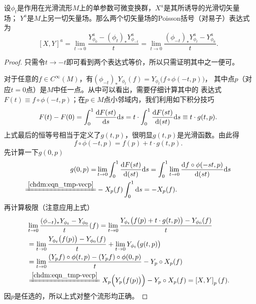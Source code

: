 \begin{theorem}\label{chdm:thm_xy-yx}
    设$\phi_t$是作用在光滑流形$M$上的单参数可微变换群，$X^a$是其所诱导的光滑切矢量场；
    $Y^a$是$M$上另一切矢量场。那么两个切矢量场的Poisson括号（对易子）表达式为
    \begin{equation}\label{chdm:eqn_xy-yx}
        \left[X,Y\right]^a = \lim_{t\to 0} \frac{Y^a_{\phi_{0}} - (\phi_{t})_{*} Y^a_{\phi_{-t}} }{t}
        =\lim_{t\to 0} \frac{(\phi_{-t})_{*} Y^a_{\phi_{t}} - Y^a_{\phi_{0}}}{t} .
    \end{equation}
\end{theorem}
\begin{proof}
    只需令$t\to -t$即可看到两个表达式等价，所以只需证明其中之一便可。
    
    对于任意的$f\in C^\infty(M)$，有$(\phi_{-t})_{*} Y_{\phi_{t}}(f)=Y_{\phi_{t}}\bigl( f\circ\phi({-t},p) \bigr)$，
    其中点$p$（对应$t=0$点）是$M$中任一点。从中可以看出，需要仔细计算其中的
    表达式$F(t)\equiv f\circ\phi({-t},p)$；在$p\in M$点小邻域内，我们利用如下积分技巧
    \begin{equation*}
        F(t)-F(0) = \int_{0}^{1} \frac{{\rm d} F(st)}{{\rm d} s} {\rm d}s
        = t \cdot \int_{0}^{1}  \frac{{\rm d} F(st)}{{\rm d} (st)} {\rm d}s 
        \equiv t \cdot g(t,p).
    \end{equation*}
    上式最后的恒等号相当于定义了$g(t,p)$，很明显$g(t,p)$是光滑函数。由此得
    \begin{equation}
        f\circ\phi({-t},p) = f(p) + t \cdot g(t,p) .
    \end{equation}
    先计算一下$g(0,p)$
    \begin{align*}
        g(0,p)=& \lim_{t\to 0} \int_{0}^{1}  \frac{{\rm d} F(st)}{{\rm d} (st)} {\rm d}s
        = \int_{0}^{1} \lim_{t\to 0} \frac{{\rm d} f\circ\phi({-st},p)}{{\rm d} (st)} {\rm d}s \\
        \xlongequal{\ref{chdm:eqn_tmp-vecp}} &
        - X_{p}(f) \int_{0}^{1}  {\rm d}s = -X_{p}(f) .
    \end{align*}
    再计算极限（注意应用上式）
    \begin{align*}
        &\lim_{t\to 0} \frac{(\phi_{-t})_{*} Y_{\phi_{t}} - Y_{\phi_{0}}}{t}(f) =
        \lim_{t\to 0} \frac{Y_{\phi_{t}}\bigl( f(p) + t \cdot g(t,p) \bigr) - Y_{\phi_{0}}(f)}{t}  \\
        &= \lim_{t\to 0} \frac{Y_{\phi_{t}}\bigl( f(p)  \bigr) - Y_{\phi_{0}}(f)}{t} 
          + \lim_{t\to 0} Y_{\phi_{t}}\bigl(  g(t,p) \bigr) \\
        &=\lim_{t\to 0} \frac{(Y_{p} f) \circ\phi(t,p)  - (Y_{p}f )\circ\phi(0,p) }{t} - Y_{p} \circ X_{p}(f) \\
        & \xlongequal{\ref{chdm:eqn_tmp-vecp}} 
        X_{p}\Bigl(Y_{p}\bigl( f (p) \bigr)\Bigr) - Y_{p} \circ X_{p}(f)
        =\left[X,Y\right]_p (f) .
    \end{align*}
    因$p$是任选的，所以上式对整个流形均正确。
\end{proof}


